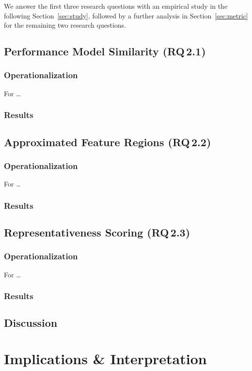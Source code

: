 We answer the first three research questions with an empirical study in the following Section~\ref{sec:study}, followed by a further analysis in Section~\ref{sec:metric} for the remaining two research questions.

\subsection{Performance Model Similarity (RQ\,2.1)}
\subsubsection{Operationalization}
For  \ldots 
\subsubsection{Results}

\subsection{Approximated Feature Regions (RQ\,2.2)}
\subsubsection{Operationalization}
For  \ldots 
\subsubsection{Results}
\subsection{Representativeness Scoring (RQ\,2.3)}
\subsubsection{Operationalization}
For  \ldots 
\subsubsection{Results}

\subsection{Discussion}

\section{Implications \& Interpretation}



